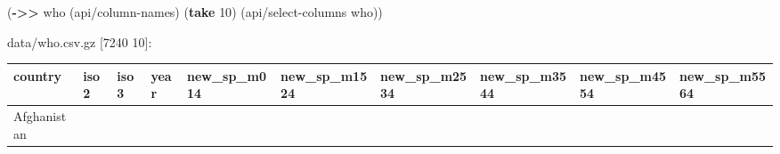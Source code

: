 \documentclass[]{article}
\newenvironment{Shaded}{\begin{snugshade}}{\end{snugshade}}
\newcommand{\KeywordTok}[1]{\textcolor[rgb]{0.13,0.29,0.53}{\textbf{#1}}}
\newcommand{\DecValTok}[1]{\textcolor[rgb]{0.00,0.00,0.81}{#1}}
\newcommand{\NormalTok}[1]{#1}
\begin{document}
\begin{Shaded}
\begin{Highlighting}[]
\NormalTok{(}\KeywordTok{->>}\NormalTok{ who}
\NormalTok{     (api/column-names)}
\NormalTok{     (}\KeywordTok{take} \DecValTok{10}\NormalTok{)}
\NormalTok{     (api/select-columns who))}
\end{Highlighting}
\end{Shaded}

data/who.csv.gz {[}7240 10{]}:

\begin{longtable}[]{@{}llllllllll@{}}
\toprule
\begin{minipage}[b]{0.08\columnwidth}\raggedright\strut
country\strut
\end{minipage} & \begin{minipage}[b]{0.04\columnwidth}\raggedright\strut
iso2\strut
\end{minipage} & \begin{minipage}[b]{0.04\columnwidth}\raggedright\strut
iso3\strut
\end{minipage} & \begin{minipage}[b]{0.04\columnwidth}\raggedright\strut
year\strut
\end{minipage} & \begin{minipage}[b]{0.08\columnwidth}\raggedright\strut
new\_sp\_m014\strut
\end{minipage} & \begin{minipage}[b]{0.09\columnwidth}\raggedright\strut
new\_sp\_m1524\strut
\end{minipage} & \begin{minipage}[b]{0.09\columnwidth}\raggedright\strut
new\_sp\_m2534\strut
\end{minipage} & \begin{minipage}[b]{0.09\columnwidth}\raggedright\strut
new\_sp\_m3544\strut
\end{minipage} & \begin{minipage}[b]{0.09\columnwidth}\raggedright\strut
new\_sp\_m4554\strut
\end{minipage} & \begin{minipage}[b]{0.09\columnwidth}\raggedright\strut
new\_sp\_m5564\strut
\end{minipage}\tabularnewline
\midrule
\endhead
\begin{minipage}[t]{0.08\columnwidth}\raggedright\strut
Afghanistan\strut
\end{minipage} & \begin{minipage}[t]{0.04\columnwidth}\raggedright\strut

\end{minipage}
\end{longtable}
\end{document}
